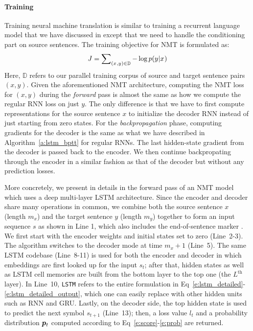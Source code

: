 \paragraph{Training}
Training neural machine translation is similar to training a recurrent
language model that we have discussed in  except that we need to
handle the conditioning part on source sentences.
The training objective for NMT is formulated as:
\begin{equation}
J = \sum_{(x_{},y_{}) \in \mathbb{D}} \nolimits -\log p(y_{}|x_{})
\label{e:j_t}
\end{equation}
Here, $\mathbb{D}$ refers to our parallel training corpus of source and target
sentence pairs $(x, y)$. Given the aforementioned NMT architecture,
computing the NMT loss for $(x, y)$ during the {\it forward} pass is
almost the same as how we compute the regular RNN loss on just $y$.
The only difference is that we have to first compute representations for the source
sentence $x$ to initialize the decoder RNN instead of just starting
from zero states. For the {\it backpropagation} phase, computing gradients for
the decoder is the same as what we have described in
Algorithm~\ref{a:lstm_bptt} for regular RNNs. The last hidden-state gradient
from the decoder is
passed back to the encoder. We then continue backpropating through the encoder
in a similar fashion as that of the decoder but without any prediction losses.

More concretely, we present in
 details in the forward pass of an NMT model which uses
a deep multi-layer LSTM architecture. Since the encoder and decoder share
many operations in common, we combine both the source sentence $x$ (length
$m_x$) and the target sentence $y$ (length $m_y$) together to form an input
sequence $s$ as shown in Line 1, which also includes the end-of-sentence marker
\word{\_}. We first start with the encoder weights and initial states
set to zero (Line~2-3). The algorithm switches to the decoder mode at time
$m_x + 1$ (Line~5). The same LSTM codebase (Line~8-11) is used for both the
encoder and decoder in which embeddings are first looked up for the input
$s_t$; after that, hidden states as well as LSTM cell memories are built from the
bottom layer to the top one (the $L^{\text{th}}$ layer). 
In Line~10, \texttt{LSTM} refers
to the entire formulation in
Eq~\ref{e:lstm_detailed}-\ref{e:lstm_detailed_output}, which one can easily
replace with other hidden units such as RNN and GRU. Lastly, on the decoder
side, the top hidden state is used to predict the next symbol $s_{t+1}$
(Line~13); then, a loss value $l_t$ and a probability distribution
$\bm{p}_{t}$ computed according to Eq~\ref{e:score}-\ref{e:prob} are returned.

